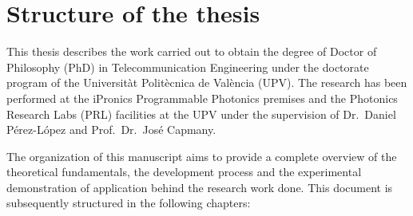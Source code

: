 
\section{Structure of the thesis} \label{sec:structure}

This thesis describes the work carried out to obtain the degree of Doctor of Philosophy (PhD) in Telecommunication Engineering under the doctorate program of the Universitàt Politècnica de València (UPV).
The research has been performed at the iPronics Programmable Photonics premises and the Photonics Research Labs (PRL) facilities at the UPV under the supervision of Dr.~Daniel Pérez-López and Prof.~Dr.~José Capmany.

The organization of this manuscript aims to provide a complete overview of the theoretical fundamentals, the development process and the experimental demonstration of application behind the research work done.
This document is subsequently structured in the following chapters:

